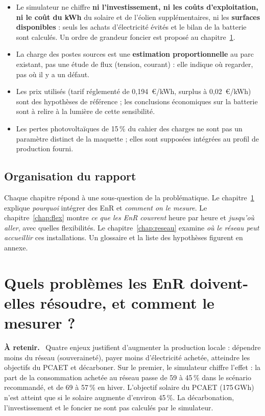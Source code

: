 \documentclass[11pt, a4paper]{report}
\newenvironment{retenir}{\par\medskip\noindent\textbf{À retenir.}\ }{\par\medskip}
\newcommand{\pct}{\,\%}
\newcommand{\gwh}{\,GWh}
\begin{document}
\begin{itemize}
  \item Le simulateur ne chiffre \textbf{ni l'investissement, ni les coûts d'exploitation, ni le coût du kWh} du solaire et de l'éolien supplémentaires, ni les \textbf{surfaces disponibles} : seuls les achats d'électricité évités et le bilan de la batterie sont calculés. Un ordre de grandeur foncier est proposé au chapitre~\ref{chap:enjeux}.
  \item La charge des postes sources est une \textbf{estimation proportionnelle} au parc existant, pas une étude de flux (tension, courant) : elle indique où regarder, pas où il y a un défaut.
  \item Les prix utilisés (tarif réglementé de 0,194~\euro/kWh, surplus à 0,02~\euro/kWh) sont des hypothèses de référence ; les conclusions économiques sur la batterie sont à relire à la lumière de cette sensibilité.
  \item Les pertes photovoltaïques de 15\pct{} du cahier des charges ne sont pas un paramètre distinct de la maquette ; elles sont supposées intégrées au profil de production fourni.
\end{itemize}

\section*{Organisation du rapport}

Chaque chapitre répond à une sous-question de la problématique. Le chapitre~\ref{chap:enjeux} explique \emph{pourquoi} intégrer des EnR et \emph{comment on le mesure}. Le chapitre~\ref{chap:flex} montre \emph{ce que les EnR couvrent} heure par heure et \emph{jusqu'où aller}, avec quelles flexibilités. Le chapitre~\ref{chap:reseau} examine \emph{où le réseau peut accueillir} ces installations. Un glossaire et la liste des hypothèses figurent en annexe.

\chapter{Quels problèmes les EnR doivent-elles résoudre, et comment le mesurer ?}
\label{chap:enjeux}

\begin{retenir}
Quatre enjeux justifient d'augmenter la production locale : dépendre moins du réseau (souveraineté), payer moins d'électricité achetée, atteindre les objectifs du PCAET et décarboner. Sur le premier, le simulateur chiffre l'effet : la part de la consommation achetée au réseau passe de 59 à 45\pct{} dans le scénario recommandé, et de 69 à 57\pct{} en hiver. L'objectif solaire du PCAET (175\gwh) n'est atteint que si le solaire augmente d'environ 45\pct. La décarbonation, l'investissement et le foncier ne sont pas calculés par le simulateur.
\end{retenir}
\end{document}
